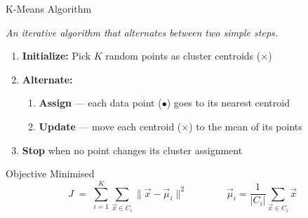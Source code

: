 \documentclass{beamer}
\begin{document}
\begin{frame}{K-Means Algorithm}

\textit{An iterative algorithm that alternates between two simple steps.}

\bigskip
\begin{enumerate}
  \setlength\itemsep{0.4em}
  \item \textbf{Initialize:}   Pick $K$ random points as cluster centroids ($\times$)
  \item \textbf{Alternate:}
        \begin{enumerate}
          \item[\textcolor{primary}{(a)}]
                \textbf{Assign} — each data point ($\bullet$) goes to its nearest centroid
          \item[\textcolor{accentcol}{(b)}]
                \textbf{Update} — move each centroid ($\times$) to the mean of its points
        \end{enumerate}
  \item \textbf{Stop} when no point changes its cluster assignment
\end{enumerate}

\bigskip
\begin{block}{Objective Minimised}
\[
  J \;=\; \sum_{i=1}^{K}\sum_{\vec{x}\in C_i}\|\vec{x}-\vec{\mu}_i\|^2
  \qquad\qquad
  \vec{\mu}_i = \frac{1}{|C_i|}\sum_{\vec{x}\in C_i}\vec{x}
\]
\end{block}

\end{frame}
\end{document}
